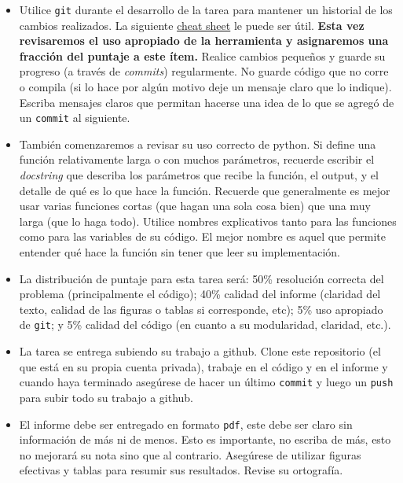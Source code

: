 \documentclass[letter, 11pt]{article}
\begin{document}
\pagebreak
{}
\begin{itemize}

  \item Utilice \texttt{git} durante el desarrollo de la tarea para mantener un
    historial de los cambios realizados. La siguiente
    \href{https://education.github.com/git-cheat-sheet-education.pdf}{cheat
      sheet} le puede ser útil. {\bf Esta vez revisaremos el uso apropiado de
    la herramienta y asignaremos una fracción del puntaje a este ítem.} Realice
    cambios pequeños y guarde su progreso (a través de \emph{commits})
    regularmente. No guarde código que no corre o compila (si lo hace por algún
    motivo deje un mensaje claro que lo indique). Escriba mensajes claros que
    permitan hacerse una idea de lo que se agregó de un \texttt{commit} al
    siguiente.

  \item También comenzaremos a revisar su uso correcto de python. Si define una
    función relativamente larga o con muchos parámetros, recuerde escribir el
    \emph{docstring} que describa los parámetros que recibe la función, el
    output, y el detalle de qué es lo que hace la función. Recuerde que
    generalmente es mejor usar varias funciones cortas (que hagan una sola cosa
    bien) que una muy larga (que lo haga todo).  Utilice nombres explicativos
    tanto para las funciones como para las variables de su código. El mejor
    nombre es aquel que permite entender qué hace la función sin tener que leer
    su implementación.

  \item La distribución de puntaje para esta tarea será: 50\% resolución
    correcta del problema (principalmente el código); 40\% calidad del informe
    (claridad del texto, calidad de las figuras o tablas si corresponde, etc);
    5\% uso apropiado de \texttt{git}; y 5\% calidad del código (en cuanto a su
    modularidad, claridad, etc.).

  \item La tarea se entrega subiendo su trabajo a github. Clone este
    repositorio (el que está en su propia cuenta privada), trabaje en el código
    y en el informe y cuando haya terminado asegúrese de hacer un último
    \texttt{commit} y luego un \texttt{push} para subir todo su trabajo a
    github.

  \item El informe debe ser entregado en formato \texttt{pdf}, este debe ser
    claro sin información de más ni de menos. Esto es importante, no escriba de
    más, esto no mejorará su nota sino que al contrario. Asegúrese de utilizar
    figuras efectivas y tablas para resumir sus resultados. Revise su
    ortografía.

\end{itemize}
\end{document}
